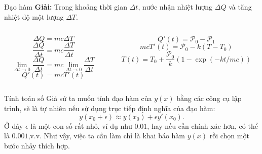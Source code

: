 \begin{frame}{Đạo hàm}
\textbf{Giải:} Trong khoảng thời gian \(\Delta t\), nước nhận nhiệt lượng \(\Delta Q\) và tăng nhiệt độ một lượng \(\Delta T\).
\begin{columns}
    \begin{column}{0.5\textwidth}
\begin{equation}
\Delta Q=mc\Delta T
\end{equation}
\begin{equation}
\dfrac{\Delta Q}{\Delta t}=mc\dfrac{\Delta T}{\Delta t}
\end{equation}
\begin{equation}
\lim_{\Delta t\to 0}\dfrac{\Delta Q}{\Delta t}=mc\lim_{\Delta t\to 0}\dfrac{\Delta T}{\Delta t}
\end{equation}
\begin{equation}
    Q'(t)=mcT'(t)
\end{equation}
    \end{column}
    \begin{column}{0.5\textwidth}
\begin{equation}
Q'(t)=\mathcal{P}_0-\mathcal{P}_1
\end{equation}
\begin{equation}
\boxed{mcT'(t)=\mathcal{P}_0-k(T-T_0)}
\end{equation}
\begin{equation}
    T(t)=T_0+\dfrac{\mathcal P_0}{k}(1-\exp(-kt/mc))
\end{equation}
    \end{column}
\end{columns}
\end{frame}

\begin{frame}{Tính toán số}
Giả sử ta muốn tính đạo hàm của \(y(x)\) bằng các công cụ lập trình, sẽ là tự nhiên nếu sử dụng trục tiếp định nghĩa của đạo hàm:
\[y(x_0+\epsilon)\approx y(x_0)+\epsilon y'(x_0).\] Ở đây \(\epsilon\) là một con số rất nhỏ, ví dụ như \(0.01\), hay nếu cần chính xác hơn, có thể là \(0.001\),v.v. Như vậy, việc ta cần làm chỉ là khai báo hàm \(y(x)\) rồi chọn một bước nhảy thích hợp. 
\end{frame}

